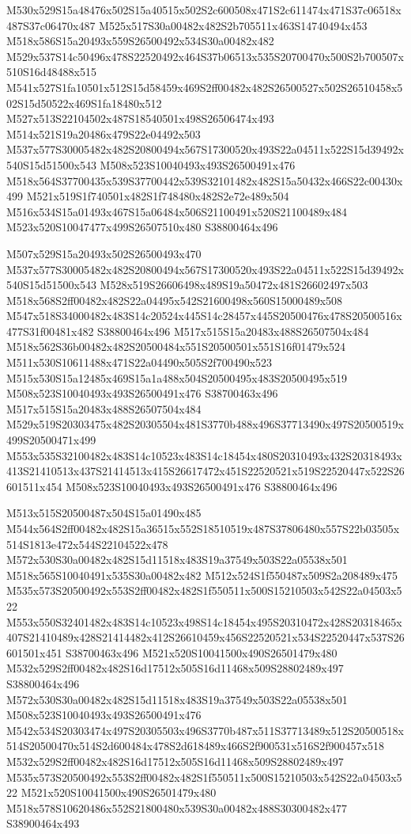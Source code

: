 \documentclass{article}
\begin{document}
\begin{multicols}{2}
M530x529S15a48476x502S15a40515x502S2c600508x471S2c611474x471S37c06518x487S37c06470x487 M525x517S30a00482x482S2b705511x463S14740494x453 M518x586S15a20493x559S26500492x534S30a00482x482 M529x537S14c50496x478S22520492x464S37b06513x535S20700470x500S2b700507x510S16d48488x515 M541x527S1fa10501x512S15d58459x469S2ff00482x482S26500527x502S26510458x502S15d50522x469S1fa18480x512 M527x513S22104502x487S18540501x498S26506474x493 M514x521S19a20486x479S22e04492x503 M537x577S30005482x482S20800494x567S17300520x493S22a04511x522S15d39492x540S15d51500x543 M508x523S10040493x493S26500491x476 M518x564S37700435x539S37700442x539S32101482x482S15a50432x466S22c00430x499 M521x519S1f740501x482S1f748480x482S2e72e489x504 M516x534S15a01493x467S15a06484x506S21100491x520S21100489x484 M523x520S10047477x499S26507510x480 S38800464x496

M507x529S15a20493x502S26500493x470 M537x577S30005482x482S20800494x567S17300520x493S22a04511x522S15d39492x540S15d51500x543 M528x519S26606498x489S19a50472x481S26602497x503 M518x568S2ff00482x482S22a04495x542S21600498x560S15000489x508 M547x518S34000482x483S14c20524x445S14c28457x445S20500476x478S20500516x477S31f00481x482 S38800464x496 M517x515S15a20483x488S26507504x484 M518x562S36b00482x482S20500484x551S20500501x551S16f01479x524 M511x530S10611488x471S22a04490x505S2f700490x523 M515x530S15a12485x469S15a1a488x504S20500495x483S20500495x519 M508x523S10040493x493S26500491x476 S38700463x496 M517x515S15a20483x488S26507504x484 M529x519S20303475x482S20305504x481S3770b488x496S37713490x497S20500519x499S20500471x499 M553x535S32100482x483S14c10523x483S14c18454x480S20310493x432S20318493x413S21410513x437S21414513x415S26617472x451S22520521x519S22520447x522S26601511x454 M508x523S10040493x493S26500491x476 S38800464x496

M513x515S20500487x504S15a01490x485 M544x564S2ff00482x482S15a36515x552S18510519x487S37806480x557S22b03505x514S1813e472x544S22104522x478 M572x530S30a00482x482S15d11518x483S19a37549x503S22a05538x501 M518x565S10040491x535S30a00482x482 M512x524S1f550487x509S2a208489x475 M535x573S20500492x553S2ff00482x482S1f550511x500S15210503x542S22a04503x522 M553x550S32401482x483S14c10523x498S14c18454x495S20310472x428S20318465x407S21410489x428S21414482x412S26610459x456S22520521x534S22520447x537S26601501x451 S38700463x496 M521x520S10041500x490S26501479x480 M532x529S2ff00482x482S16d17512x505S16d11468x509S28802489x497 S38800464x496 M572x530S30a00482x482S15d11518x483S19a37549x503S22a05538x501 M508x523S10040493x493S26500491x476 M542x534S20303474x497S20305503x496S3770b487x511S37713489x512S20500518x514S20500470x514S2d600484x478S2d618489x466S2f900531x516S2f900457x518 M532x529S2ff00482x482S16d17512x505S16d11468x509S28802489x497 M535x573S20500492x553S2ff00482x482S1f550511x500S15210503x542S22a04503x522 M521x520S10041500x490S26501479x480 M518x578S10620486x552S21800480x539S30a00482x488S30300482x477 S38900464x493


\end{multicols}
\end{document}
